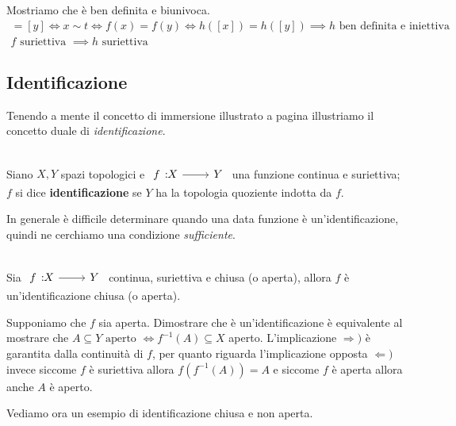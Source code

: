 Mostriamo che è ben definita e biunivoca.
	\begin{gather*}
		[x]=[y]\iff x\sim t\iff f(x)=f(y)\iff h([x])=h([y]) \implies h \text{ ben definita e iniettiva }\\
		f \text{ suriettiva } \implies h \text{ suriettiva}
	\end{gather*}
\subsection{Identificazione}
Tenendo a mente il concetto di immersione illustrato a pagina \pageref{immersione} illustriamo il concetto duale di \textit{identificazione}.
\begin{define}[Identificazione.]~{}\\
	Siano $X,Y$ spazi topologici e $\funz f X Y$ una funzione continua e suriettiva; $f$ si dice \textbf{identificazione} se $Y$ ha la topologia quoziente indotta da $f$.
\end{define}
In generale è difficile determinare quando una data funzione è un'identificazione, quindi ne cerchiamo una condizione \textit{sufficiente}.
\begin{theorema}~{}\\ \label{condizione sufficiente identificazione}
	Sia $\funz f X Y$ continua, suriettiva e chiusa (o aperta), allora $f$ è un'identificazione chiusa (o aperta).
\end{theorema}
\begin{demonstration}
	Supponiamo che $f$ sia aperta. Dimostrare che è un'identificazione è equivalente al mostrare che $\displaystyle A\subseteq Y \text{ aperto } \iff f^{-1}(A)\subseteq X$ aperto. L'implicazione $\Rightarrow)$ è garantita dalla continuità di $f$, per quanto riguarda l'implicazione opposta $\Leftarrow)$ invece siccome $f$ è suriettiva allora $f(f^{-1}(A))=A$ e siccome $f$ è aperta allora anche $A$ è aperto.
\end{demonstration}
Vediamo ora un esempio di identificazione chiusa e non aperta.
